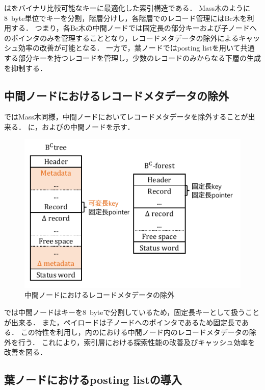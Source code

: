 \Bcforest{}は\Bctree{}をバイナリ比較可能なキーに最適化した索引構造である．
Mass木のように8~byte単位でキーを分割，階層分けし，各階層でのレコード管理にはBc木を利用する．
つまり，各Bc木の中間ノードでは固定長の部分キーおよび子ノードへのポインタのみを管理することとなり，レコードメタデータの除外によるキャッシュ効率の改善が可能となる．
一方で，葉ノードではposting listを用いて共通する部分キーを持つレコードを管理し，少数のレコードのみからなる下層の生成を抑制する．

\subsection{中間ノードにおけるレコードメタデータの除外}
\Bcforest{}ではMass木同様，中間ノードにおいてレコードメタデータを除外することが出来る．
\Fig{\ref{fig:inner}}に，\Bctree{}および\Bcforest{}の中間ノードを示す．

\begin{figure}[t]
    \centering
    \includegraphics{./figures/inner_node.pdf}
    \caption{\Bcforest{}中間ノードにおけるレコードメタデータの除外}
    \label{fig:inner}
\end{figure}

\Bcforest{}では中間ノードはキーを8~byteで分割しているため，固定長キーとして扱うことが出来る．
また，ペイロードは子ノードへのポインタであるため固定長である．
この特性を利用し，\Bcforest{}内の\Bctree{}における中間ノード内のレコードメタデータの除外を行う．
これにより，索引層における探索性能の改善及びキャッシュ効率を改善を図る．

\subsection{葉ノードにおけるposting listの導入}

